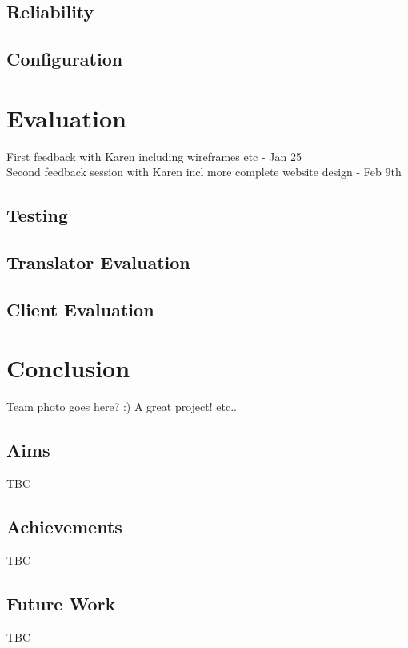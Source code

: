 \documentclass{l3proj}
\begin{document}
\section{Reliability}
\section{Configuration}


\chapter{Evaluation}
\label{chap:eval}
First feedback with Karen including wireframes etc - Jan 25\\
Second feedback session with Karen incl more complete website design - Feb 9th

\section{Testing}
\label{sect:testing}
\section{Translator Evaluation}
\label{trans-eval}
\section{Client Evaluation}
\label{cli-eval}
\chapter{Conclusion}
\label{chap:concl}
Team photo goes here? :)
A great project! etc..

\section{Aims}
\label{sect:aims}
TBC

\section{Achievements}
\label{sect:achv}
TBC

\section{Future Work}
\label{sect:fut-work}
TBC
\end{document}
